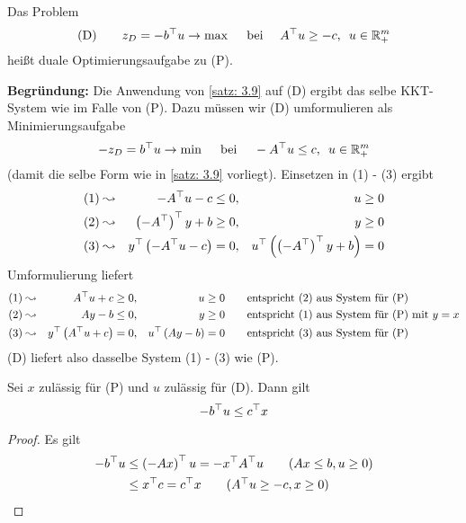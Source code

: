 \begin{definition} %
	Das Problem
	\begin{equation}
		\text{(D)} \qquad z_D = -b^{\top} u \to \max \quad \text{ bei } \quad A^{\top} u \ge -c, \enskip u \in \mathbb{R}_+^m 
		\label{eq: 3.12}
	\end{equation}
	heißt duale Optimierungsaufgabe zu (P).
\end{definition}

\textbf{Begründung:} Die Anwendung von \cref{satz: 3.9} auf (D) ergibt das selbe KKT-System wie im Falle von (P). Dazu müssen wir (D) umformulieren als Minimierungsaufgabe
\begin{equation*}
	- z_D = b^{\top} u \to \min \quad \text{ bei } \quad -A^{\top} u \le c, \enskip u \in \mathbb{R}_+^m
\end{equation*}
(damit die selbe Form wie in \cref{satz: 3.9} vorliegt).
Einsetzen in (1) - (3) ergibt
\begin{equation*}
	\begin{alignedat}{3}
		\text{(1)} &\leadsto &-A^{\top} u - c &\le 0, \enskip &u &\ge 0 \\
		\text{(2)} &\leadsto &\left( -A^{\top} \right)^{\top} y + b &\ge 0, \enskip &y &\ge 0 \\
		\text{(3)} &\leadsto \quad &y^{\top} \left( -A^{\top} u - c \right) &= 0, \quad &u^{\top} \left( \left( -A^{\top} \right)^{\top} y + b \right) &= 0
	\end{alignedat}
\end{equation*}
Umformulierung liefert
\begin{equation*}
	\begin{alignedat}{4}
		\text{(1)} &\leadsto &A^{\top} u +  c &\ge 0, \enskip &u &\ge 0 \qquad &&\text{entspricht (2) aus System für (P)} \\
		\text{(2)} &\leadsto &Ay - b &\le 0, &y &\ge 0 \qquad &&\text{entspricht (1) aus System für (P) mit $y = x$} \\
		\text{(3)} &\leadsto \quad &y^{\top} \left( A^{\top} u + c \right) &= 0, \quad &u^{\top} \left( Ay - b \right) &= 0 \qquad &&\text{entspricht (3) aus System für (P)}
	\end{alignedat}
\end{equation*}
(D) liefert also dasselbe System (1) - (3) wie (P).

\begin{satz} %
	Sei $x$ zulässig für (P) und $u$ zulässig für (D). Dann gilt
	\begin{equation*}
		-b^{\top} u \le c^{\top} x
	\end{equation*}
\end{satz}
\begin{proof}
	Es gilt
	\begin{align*}
		-\trans{b} u &\le \transpose{-Ax} u = - \trans{x} \trans{A} u \tag{$Ax \le b, u \ge 0$} \\
		&\le \trans{x} c = \trans{c} x \tag{$\trans{A} u \ge -c, x \ge 0$}
	\end{align*}
\end{proof}

